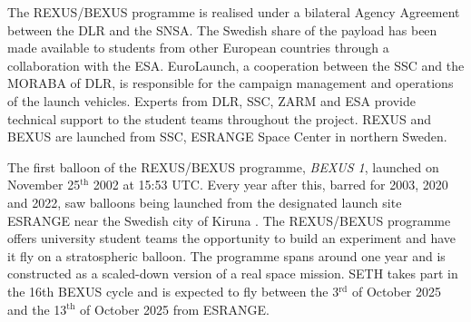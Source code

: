 The \acf{REXUS/BEXUS} programme is realised under a bilateral Agency Agreement between the \acf{DLR} and the \acf{SNSA}. The Swedish share of the payload has been made available to students from other European countries through a collaboration with the \acf{ESA}. EuroLaunch, a cooperation between the \acf{SSC} and the \acf{MORABA} of \acs{DLR}, is responsible for the campaign management and operations of the launch vehicles. Experts from \acs{DLR}, \acs{SSC}, \acs{ZARM} and \acs{ESA} provide technical support to the student teams throughout the project. \acs{REXUS} and \acs{BEXUS} are launched from \acs{SSC}, \acs{ESRANGE} Space Center in northern Sweden.

The first balloon of the \acs{REXUS/BEXUS} programme, \textit{BEXUS 1}, launched on November 25$^{\mathrm{th}}$ 2002 at 15:53 UTC. Every year after this, barred for 2003, 2020 and 2022, saw balloons being launched from the designated launch site \ac{ESRANGE} near the Swedish city of Kiruna \parencite{IAC-08.E.1.1.4}\parencite{bexus-campaign-history}.
The \ac{REXUS/BEXUS} programme offers university student teams the opportunity to build an experiment and have it fly on a stratospheric balloon. The programme spans around one year and is constructed as a scaled-down version of a real space mission. \ac{SETH} takes part in the 16th \ac{BEXUS} cycle and is expected to fly between the 3$^\mathrm{rd}$ of October 2025 and the 13$^\mathrm{th}$ of October 2025 from \ac{ESRANGE}.

